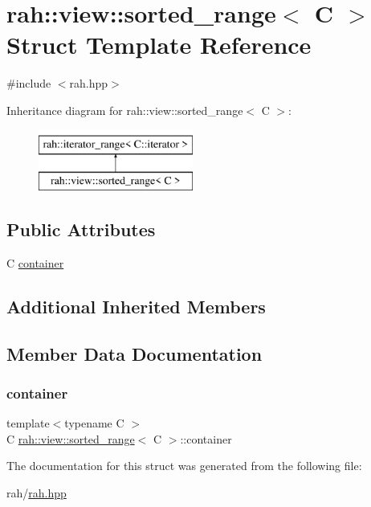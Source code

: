 \hypertarget{structrah_1_1view_1_1sorted__range}{}\section{rah\+::view\+::sorted\+\_\+range$<$ C $>$ Struct Template Reference}
\label{structrah_1_1view_1_1sorted__range}


{\ttfamily \#include $<$rah.\+hpp$>$}

Inheritance diagram for rah\+::view\+::sorted\+\_\+range$<$ C $>$\+:\begin{figure}[H]
\begin{center}
\leavevmode
\includegraphics[height=2.000000cm]{structrah_1_1view_1_1sorted__range}
\end{center}
\end{figure}
\subsection*{Public Attributes}
\begin{DoxyCompactItemize}
\item 
C \mbox{\hyperlink{structrah_1_1view_1_1sorted__range_aff93d4f24e5ee3611ffb9faf7a2748c2}{container}}
\end{DoxyCompactItemize}
\subsection*{Additional Inherited Members}


\subsection{Member Data Documentation}
\mbox{\label{structrah_1_1view_1_1sorted__range_aff93d4f24e5ee3611ffb9faf7a2748c2}} 
\subsubsection{\texorpdfstring{container}{container}}
{\footnotesize\ttfamily template$<$typename C $>$ \\
C \mbox{\hyperlink{structrah_1_1view_1_1sorted__range}{rah\+::view\+::sorted\+\_\+range}}$<$ C $>$\+::container}



The documentation for this struct was generated from the following file\+:\begin{DoxyCompactItemize}
\item 
rah/\mbox{\hyperlink{rah_8hpp}{rah.\+hpp}}\end{DoxyCompactItemize}
